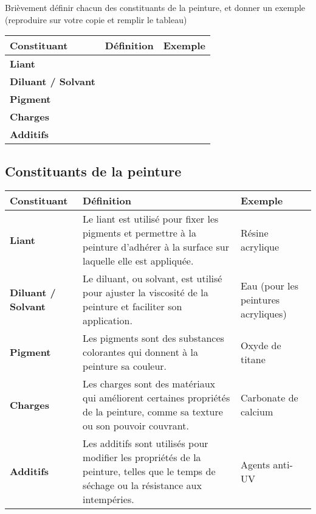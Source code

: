 \documentclass[answers]{exam}
\begin{document}
\begin{questions}

  \question[4] Brièvement définir chacun des constituants de la peinture, et donner un exemple (reproduire sur votre copie et remplir le tableau)

  \begin{center}
    \begin{tabular}{|>{\bfseries}l|p{7cm}|p{4cm}|}
    \hline
    Constituant & Définition & Exemple \\
    \hline
    Liant &  &  \\
    \hline
    Diluant / Solvant &  &  \\
    \hline
    Pigment & &  \\
    \hline
    Charges &  &  \\
    \hline
    Additifs &  &  \\
    \hline
    \end{tabular}
    \end{center}

  

\begin{solution}


\subsection*{Constituants de la peinture}

\begin{center}
\begin{tabular}{|>{\bfseries}l|p{7cm}|p{4cm}|}
\hline
Constituant & Définition & Exemple \\
\hline
Liant & Le liant est utilisé pour fixer les pigments et permettre à la peinture d'adhérer à la surface sur laquelle elle est appliquée. & Résine acrylique \\
\hline
Diluant / Solvant & Le diluant, ou solvant, est utilisé pour ajuster la viscosité de la peinture et faciliter son application. & Eau (pour les peintures acryliques) \\
\hline
Pigment & Les pigments sont des substances colorantes qui donnent à la peinture sa couleur. & Oxyde de titane \\
\hline
Charges & Les charges sont des matériaux qui améliorent certaines propriétés de la peinture, comme sa texture ou son pouvoir couvrant. & Carbonate de calcium \\
\hline
Additifs & Les additifs sont utilisés pour modifier les propriétés de la peinture, telles que le temps de séchage ou la résistance aux intempéries. & Agents anti-UV \\
\hline
\end{tabular}
\end{center}



\end{solution}
\end{questions}
\end{document}
